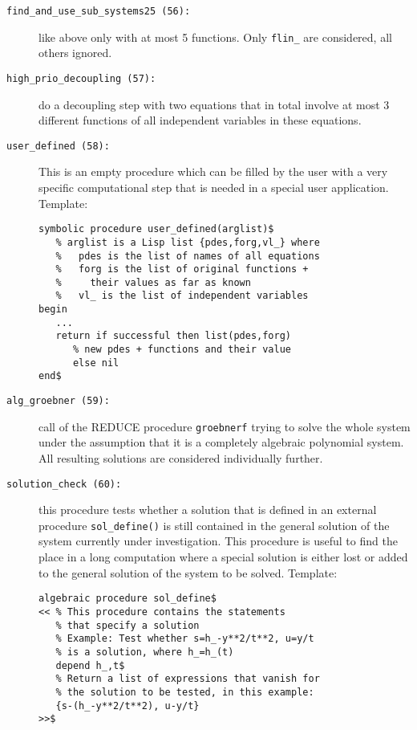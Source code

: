 \begin{description}
\item[\texttt{find\_and\_use\_sub\_systems25
    \hypertarget{crack-m_56}{(56)}:}] like above only with at most 5
  functions.  Only \texttt{flin\_} are considered, all others ignored.
\item[\texttt{high\_prio\_decoupling \hypertarget{crack-m_57}{(57)}:}]
  do a decoupling step with two equations that in total involve at
  most 3 different functions of all independent variables in these
  equations.
\item[\texttt{user\_defined \hypertarget{crack-m_58}{(58)}:}] This is
  an empty procedure which can be filled by the user with a very
  specific computational step that is needed in a special user
  application.  Template:
\begin{verbatim}
symbolic procedure user_defined(arglist)$
   % arglist is a Lisp list {pdes,forg,vl_} where
   %   pdes is the list of names of all equations
   %   forg is the list of original functions +
   %     their values as far as known
   %   vl_ is the list of independent variables
begin
   ...
   return if successful then list(pdes,forg)
      % new pdes + functions and their value
      else nil
end$
\end{verbatim}
\item[\texttt{alg\_groebner \hypertarget{crack-m_59}{(59)}:}] call of
  the REDUCE procedure \texttt{groebnerf} trying to solve the whole
  system under the assumption that it is a completely algebraic
  polynomial system.  All resulting solutions are considered
  individually further.
\item[\texttt{solution\_check \hypertarget{crack-m_60}{(60)}:}] this
  procedure tests whether a solution that is defined in an external
  procedure \texttt{sol\_define()} is still contained in the general
  solution of the system currently under investigation.  This
  procedure is useful to find the place in a long computation where a
  special solution is either lost or added to the general solution of
  the system to be solved.  Template:
\begin{verbatim}
algebraic procedure sol_define$
<< % This procedure contains the statements
   % that specify a solution
   % Example: Test whether s=h_-y**2/t**2, u=y/t
   % is a solution, where h_=h_(t)
   depend h_,t$
   % Return a list of expressions that vanish for
   % the solution to be tested, in this example:
   {s-(h_-y**2/t**2), u-y/t}
>>$
\end{verbatim}
\end{description}

